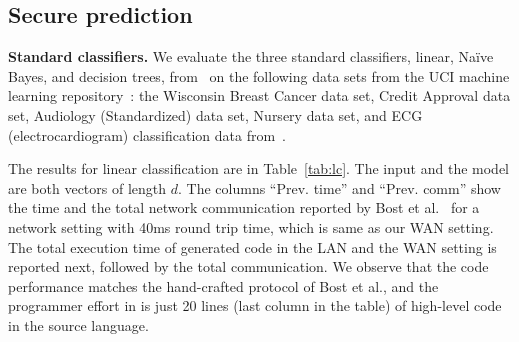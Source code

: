 
\subsection{Secure prediction}
\noindent\textbf{Standard classifiers.}
We evaluate the three standard classifiers, linear, Na\"{i}ve Bayes, and
decision trees, from~\cite{shafindss} on the following data sets from the UCI
machine learning repository~\cite{uci}:
 the Wisconsin Breast Cancer data set, 
Credit Approval data set, Audiology (Standardized) data set, Nursery
data set, and ECG (electrocardiogram) classification data
from~\cite{barni}.

The results for linear
classification are in Table~\ref{tab:lc}.
The input and the model are both vectors of length $d$. 
The columns ``Prev. time'' and ``Prev. comm'' show the time and the total
network communication reported by Bost et al.~\cite{shafindss} for a
network setting with 40ms
round trip time, which is same as our WAN setting. The total execution
time
of \tool generated code in the LAN and the WAN setting is reported
next, followed by the total communication.
We observe that the \tool code performance matches the hand-crafted protocol of Bost
et al., and the programmer effort in \tool is just 20
lines (last column in the table) of high-level code in the \tool
source language. %


